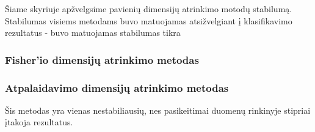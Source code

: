 Šiame skyriuje apžvelgsime pavienių dimensijų atrinkimo motodų stabilumą. 
Stabilumas visiems metodams buvo matuojamas atsižvelgiant į klasifikavimo
rezultatus - buvo matuojamas stabilumas tikra

\subsubsection{Fisher'io dimensijų atrinkimo metodas}

\subsubsection{Atpalaidavimo dimensijų atrinkimo metodas}

Šis metodas yra vienas nestabiliausių, nes pasikeitimai duomenų rinkinyje 
stipriai įtakoja rezultatus.